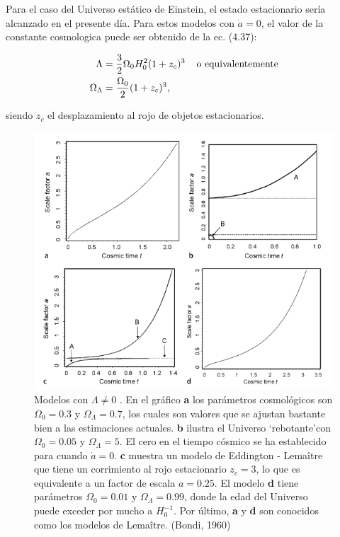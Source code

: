 \documentclass[11pt]{article}
\begin{document}
{\begin{itemize}
\begin{itemize}
           Para el caso del Universo estático de Einstein, el estado estacionario sería alcanzado en el presente día. Para estos modelos con $\dot{a} = 0$, el valor de la constante cosmologica puede ser obtenido de la ec. (4.37):
           
           \begin{align}
               \Lambda & = \frac{3}{2} \Omega_0 H_0^2 (1 + z_c)^3 \hspace{0.4cm} \text{o equivalentemente} \\
               \Omega_{\Lambda} & = \frac{\Omega_0}{2} (1 + z_c)^3,
           \end{align}
           
           siendo $z_c$ el desplazamiento al rojo de objetos estacionarios. 
       \end{itemize}
       
       
    \end{itemize}
    
    
    
     \begin{figure}[H]         
     \centering
     \includegraphics[width=1.0\textwidth]{graficos73_pp226Mlalcon.png}
        \caption{\footnotesize{Modelos con $\Lambda \neq 0$ }. En el gráfico {\bf{a}} los parámetros cosmológicos son $\Omega_0=0.3$ y $\Omega_{\Lambda}= 0.7$, los cuales son valores que se ajustan bastante bien a las estimaciones actuales. {\bf{b}} ilustra el Universo `rebotante'con $\Omega_0 = 0.05$ y $\Omega_{\Lambda}=5$. El cero en el tiempo cósmico se ha establecido para cuando $\dot{a}=0$. {\bf{c}} muestra un modelo de Eddington - Lema\^itre que tiene un corrimiento al rojo estacionario $z_c = 3$, lo que es equivalente a un factor de escala $a=0.25$. El modelo {\bf{d}} tiene parámetros $\Omega_0 = 0.01$ y $\Omega_{\Lambda}= 0.99$, donde la edad del Universo puede exceder por mucho a $H_0^{-1}$. Por último, {\bf{a}} y {\bf{d}} son conocidos como los modelos de Lema\^itre. (Bondi, 1960)}
     \end{figure}
    
}
\end{document}
